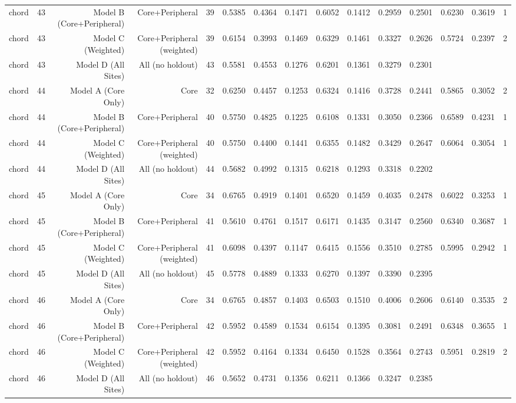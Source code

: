 {\begin{longtable}{lrrrrrrrrrrrrrr}
  chord & 43 & Model B (Core+Peripheral) & Core+Peripheral & 39 & 0.5385 & 0.4364 & 0.1471 & 0.6052 & 0.1412 & 0.2959 & 0.2501 & 0.6230 & 0.3619 & 1 \\
  chord & 43 & Model C (Weighted) & Core+Peripheral (weighted) & 39 & 0.6154 & 0.3993 & 0.1469 & 0.6329 & 0.1461 & 0.3327 & 0.2626 & 0.5724 & 0.2397 & 2 \\
  chord & 43 & Model D (All Sites) & All (no holdout) & 43 & 0.5581 & 0.4553 & 0.1276 & 0.6201 & 0.1361 & 0.3279 & 0.2301 &  &  &  \\
  chord & 44 & Model A (Core Only) & Core & 32 & 0.6250 & 0.4457 & 0.1253 & 0.6324 & 0.1416 & 0.3728 & 0.2441 & 0.5865 & 0.3052 & 2 \\
  chord & 44 & Model B (Core+Peripheral) & Core+Peripheral & 40 & 0.5750 & 0.4825 & 0.1225 & 0.6108 & 0.1331 & 0.3050 & 0.2366 & 0.6589 & 0.4231 & 1 \\
  chord & 44 & Model C (Weighted) & Core+Peripheral (weighted) & 40 & 0.5750 & 0.4400 & 0.1441 & 0.6355 & 0.1482 & 0.3429 & 0.2647 & 0.6064 & 0.3054 & 1 \\
  chord & 44 & Model D (All Sites) & All (no holdout) & 44 & 0.5682 & 0.4992 & 0.1315 & 0.6218 & 0.1293 & 0.3318 & 0.2202 &  &  &  \\
  chord & 45 & Model A (Core Only) & Core & 34 & 0.6765 & 0.4919 & 0.1401 & 0.6520 & 0.1459 & 0.4035 & 0.2478 & 0.6022 & 0.3253 & 1 \\
  chord & 45 & Model B (Core+Peripheral) & Core+Peripheral & 41 & 0.5610 & 0.4761 & 0.1517 & 0.6171 & 0.1435 & 0.3147 & 0.2560 & 0.6340 & 0.3687 & 1 \\
  chord & 45 & Model C (Weighted) & Core+Peripheral (weighted) & 41 & 0.6098 & 0.4397 & 0.1147 & 0.6415 & 0.1556 & 0.3510 & 0.2785 & 0.5995 & 0.2942 & 1 \\
  chord & 45 & Model D (All Sites) & All (no holdout) & 45 & 0.5778 & 0.4889 & 0.1333 & 0.6270 & 0.1397 & 0.3390 & 0.2395 &  &  &  \\
  chord & 46 & Model A (Core Only) & Core & 34 & 0.6765 & 0.4857 & 0.1403 & 0.6503 & 0.1510 & 0.4006 & 0.2606 & 0.6140 & 0.3535 & 2 \\
  chord & 46 & Model B (Core+Peripheral) & Core+Peripheral & 42 & 0.5952 & 0.4589 & 0.1534 & 0.6154 & 0.1395 & 0.3081 & 0.2491 & 0.6348 & 0.3655 & 1 \\
  chord & 46 & Model C (Weighted) & Core+Peripheral (weighted) & 42 & 0.5952 & 0.4164 & 0.1334 & 0.6450 & 0.1528 & 0.3564 & 0.2743 & 0.5951 & 0.2819 & 2 \\
  chord & 46 & Model D (All Sites) & All (no holdout) & 46 & 0.5652 & 0.4731 & 0.1356 & 0.6211 & 0.1366 & 0.3247 & 0.2385 &  &  &  \\

\end{longtable}}
